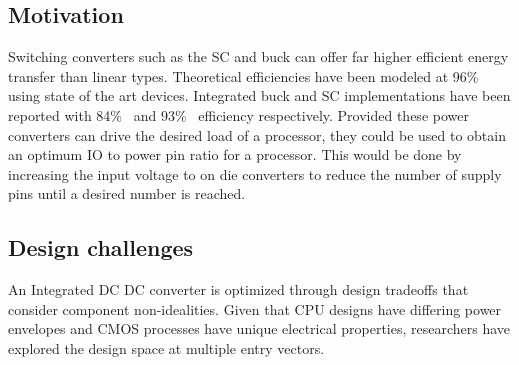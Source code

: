 \documentclass[letterpaper,twocolumn,10pt]{article}
\begin{document}
\subsection{Motivation}
Switching converters such as the SC and buck can offer far higher efficient energy transfer than linear types. Theoretical efficiencies have been modeled at 96\%~\cite{Rodriguez2014} using state of the art devices. Integrated buck and SC implementations have been reported with 84\%~\cite{Cheng2013} and 93\%~\cite{Damak2013} efficiency respectively. Provided these power converters can drive the desired load of a processor, they could be used to obtain an optimum IO to power pin ratio for a processor. This would be done by increasing the input voltage to on die converters to reduce the number of supply pins until a desired number is reached.  

\subsection{Design challenges}
An Integrated DC DC converter is optimized through design tradeoffs that consider component non-idealities. Given that CPU designs have differing power envelopes and CMOS processes have unique electrical properties, researchers have explored the design space at multiple entry vectors.\\  
\end{document}
